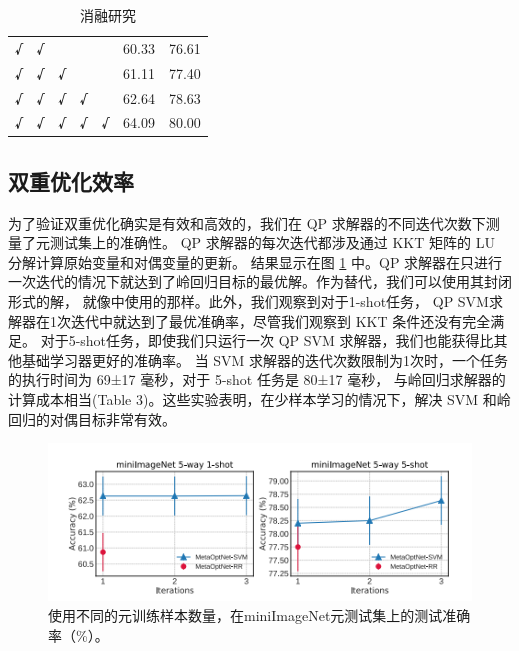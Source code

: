 \begin{table}[htbp]
\begin{tabular}{ccccc|cc}
    \textbf{√}                                                   & \textbf{√}                                                      &                                                               &                                                               &                                                                & 60.33           & 76.61           \\
    \textbf{√}                                                   & \textbf{√}                                                      & \textbf{√}                                                    &                                                               &                                                                & 61.11           & 77.40           \\
    \textbf{√}                                                   & \textbf{√}                                                      & \textbf{√}                                                    & \textbf{√}                                                    &                                                                & 62.64           & 78.63           \\
    \textbf{√}                                                   & \textbf{√}                                                      & \textbf{√}                                                    & \textbf{√}                                                    & \textbf{√}                                                     & 64.09           & 80.00           \\ \hline
    \end{tabular}
    \caption{消融研究}
    \label{table:4}
    \end{table}

\subsection{双重优化效率}

为了验证双重优化确实是有效和高效的，我们在 QP 求解器的不同迭代次数下测量了元测试集上的准确性。
QP 求解器\cite{amos2017optnet}的每次迭代都涉及通过 KKT 矩阵的 LU 分解计算原始变量和对偶变量的更新。
结果显示在图 \ref{fig:3} 中。QP 求解器在只进行一次迭代的情况下就达到了岭回归目标的最优解。作为替代，我们可以使用其封闭形式的解，
就像\cite{bertinetto2018meta}中使用的那样。此外，我们观察到对于1-shot任务，
QP SVM求解器在1次迭代中就达到了最优准确率，尽管我们观察到 KKT 条件还没有完全满足。
对于5-shot任务，即使我们只运行一次 QP SVM 求解器，我们也能获得比其他基础学习器更好的准确率。
当 SVM 求解器的迭代次数限制为1次时，一个任务的执行时间为 69±17 毫秒，对于 5-shot 任务是 80±17 毫秒，
与岭回归求解器的计算成本相当(Table 3)。这些实验表明，在少样本学习的情况下，解决 SVM 和岭回归的对偶目标非常有效。

\begin{figure}[htbp]
    \centering
    \includegraphics[width=.7\linewidth]{figure/f3.png}
    \caption{使用不同的元训练样本数量，在miniImageNet元测试集上的测试准确率（\%）。}
    \label{fig:3}
\end{figure}
